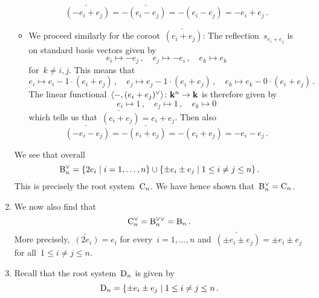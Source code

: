 \begin{example}
\begin{enumerate}
\begin{itemize}
          \[
            \check{(-e_i + e_j)}
            =
            -\check{(e_i - e_j)}
            =
            -(e_i - e_j)
            =
            -e_i + e_j \,.
          \]
        \item
          We proceed similarly for the coroot~$\check{(e_i + e_j)}$:
          The reflection~$s_{e_i + e_j}$ is on standard basis vectors given by
          \[
            e_i
            \mapsto
            -e_j \,,
            \quad
            e_j
            \mapsto
            -e_i \,,
            \quad
            e_k
            \mapsto
            e_k
          \]
          for~$k \neq i,j$.
          This means that
          \[
            e_i
            \mapsto
            e_i - 1 \cdot (e_i + e_j) \,,
            \quad
            e_j
            \mapsto
            e_j - 1 \cdot (e_i + e_j) \,,
            \quad
            e_k
            \mapsto
            e_k - 0 \cdot (e_i + e_j) \,.
          \]
          The linear functional~$\pair{-, \check{(e_i + e_j)}} \colon \kf^n \to \kf$ is therefore given by
          \[
            e_i
            \mapsto
            1 \,,
            \quad
            e_j
            \mapsto
            1 \,,
            \quad
            e_k
            \mapsto
            0
          \]
          which tells us that~$\check{(e_i + e_j)} = e_i + e_j$.
          Then also
          \[
            \check{(- e_i - e_j)}
            =
            -\check{(e_i + e_j)}
            =
            -(e_i + e_j)
            =
            - e_i - e_j \,.
          \]
      \end{itemize}
      We see that overall
      \[
        \check{\rootB_n}
        =
        \{
          2 e_i
        \suchthat
          i = 1, \dotsc, n
        \}
        \cup
        \{
          \pm e_i \pm e_j
        \suchthat
          1 \leq i \neq j \leq n
        \} \,.
      \]
      This is precisely the root system~$\mathrm{C}_n$.
      We have hence shown that~$\check{\rootB_n} = \rootC_n$.
    \item
      We now also find that
      \[
        \check{\rootC_n}
        =
        \dcheck{\rootB_n}
        =
        \rootB_n \,.
      \]
      More precisely,~$\check{(2 e_i)} = e_i$ for every~$i = 1, \dotsc, n$ and~$\check{(\pm e_i \pm e_j)} = \pm e_i \pm e_j$ for all~$1 \leq i \neq j \leq n$.
    \item
      Recall that the root system~$\mathrm{D}_n$ is given by
      \[
        \rootD_n
        =
        \{
          \pm e_i \pm e_j
        \suchthat
          1 \leq i \neq j \leq n \,.
\]
\end{enumerate}
\end{example}
